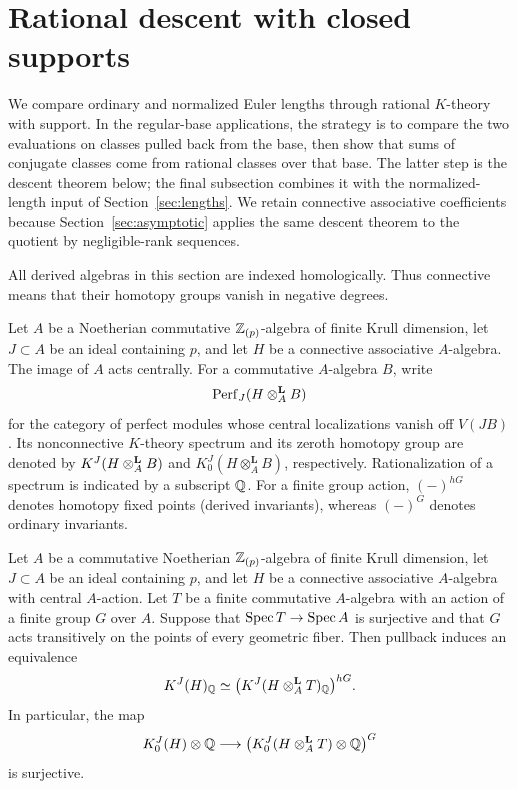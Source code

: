 \section{Rational descent with closed supports}
\label{sec:descent}

We compare ordinary and normalized Euler lengths through rational
$K$-theory with support. In the regular-base applications, the strategy
is to compare the two evaluations on classes pulled back from the base,
then show that sums of conjugate classes come from rational classes over
that base. The latter step is the descent theorem below; the final
subsection combines it with the normalized-length input of
Section~\ref{sec:lengths}. We retain connective associative coefficients
because Section~\ref{sec:asymptotic} applies the same descent theorem to
the quotient by negligible-rank sequences.

All derived algebras in this section are indexed homologically. Thus
connective means that their homotopy groups vanish in negative degrees.

Let $A$ be a Noetherian commutative $\mathbb{Z}_{(p)}$-algebra of finite Krull
dimension, let $J\subset A$ be an ideal containing $p$, and let
$H$ be a connective associative $A$-algebra. The image of $A$ acts
centrally. For a commutative $A$-algebra $B$, write
\[
 \operatorname{Perf}_J(H\otimes_A^{\mathbf L}B)
\]
for the category of perfect modules whose central localizations vanish
off $V(JB)$. Its nonconnective $K$-theory spectrum and its zeroth
homotopy group are denoted by
$K^J(H\otimes_A^{\mathbf L}B)$ and
$K_0^J(H\otimes_A^{\mathbf L}B)$, respectively. Rationalization of a
spectrum is indicated by a subscript $\mathbb{Q}$.
For a finite group action, $(-)^{hG}$ denotes homotopy fixed points
(derived invariants), whereas $(-)^G$ denotes ordinary invariants.

\begin{theorem}
\label{ds:descent}
Let $A$ be a commutative Noetherian $\mathbb{Z}_{(p)}$-algebra of finite Krull
dimension, let $J\subset A$ be an ideal containing $p$, and let $H$ be a connective
associative $A$-algebra with central $A$-action.
Let $T$ be a finite commutative $A$-algebra with an action of a finite
group $G$ over $A$. Suppose that $\operatorname{Spec} T\to\operatorname{Spec} A$ is surjective and
that $G$ acts transitively on the points of every geometric fiber.
Then pullback induces an equivalence
\begin{equation}
 K^J(H)_{\mathbb{Q}}
 \simeq
 \bigl(K^J(H\otimes_A^{\mathbf L}T)_{\mathbb{Q}}\bigr)^{hG}.
 \label{ds:spectral-descent}
\end{equation}
In particular, the map
\begin{equation}
 K_0^J(H)\otimes\mathbb{Q}
 \longrightarrow
 \bigl(K_0^J(H\otimes_A^{\mathbf L}T)\otimes\mathbb{Q}\bigr)^G
 \label{ds:kzero-descent}
\end{equation}
is surjective.
\end{theorem}

